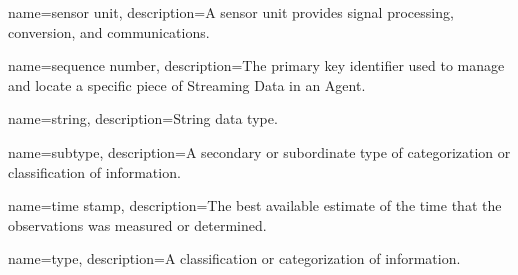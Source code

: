 {
    name={sensor unit},
	description={A \gls{sensor unit} provides signal processing, conversion, and communications.}
}

{
    name={sequence number},
	description={The primary key identifier used to manage and locate a specific piece of \gls{Streaming Data} in an \gls{Agent}.}
}

{
    name={string},
	description={String data type.}
}

{
    name={subtype},
	description={A secondary or subordinate type of categorization or classification of information.}
}

{
    name={time stamp},
	description={The best available estimate of the time that the \glspl{observation} was measured or determined.}
}

{
    name={type},
	description={A classification or categorization of information.}
}

